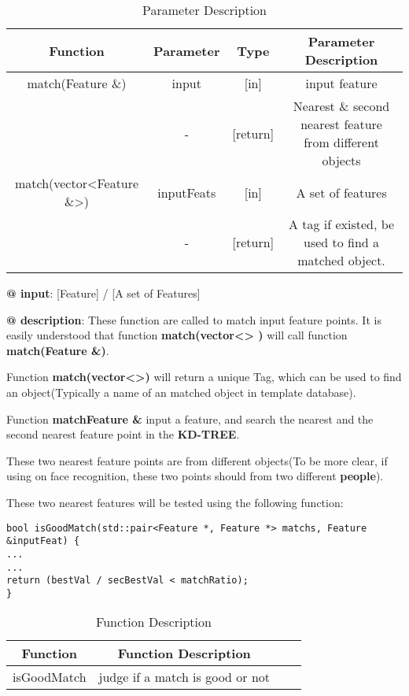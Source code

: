 \documentclass[paper=a4, fontsize=11pt]{scrartcl} %
\numberwithin{equation}{section} %
\numberwithin{figure}{section} %
\numberwithin{table}{section} %
\begin{document}
\begin{table}[h]
    \centering
    \begin{tabular}{|c|c|c|c|}
        \hline
        \textbf{Function} & \textbf{Parameter} & \textbf{Type} & \textbf{Parameter Description} \\\hline
            match(Feature \&) & input & [in] & input feature\\
                           & - & [return] & Nearest \& second nearest feature from different objects\\\hline
        match(vector<Feature \&>)& inputFeats & [in] & A set of features \\
                              & - & [return] & A tag if existed, be used to find a matched object.\\\hline
    \end{tabular}
    \caption{Parameter Description}\label{nolock}
\end{table}

\textbf{@ input}: [Feature] / [A set of Features]

\textbf{@ description}: These function are called to match input feature points. It is easily understood that function \textbf{match(vector<> )} will call function \textbf{match(Feature \&)}.

Function \textbf{match(vector<>)} will return a unique Tag, which can be used to find an object(Typically a name of an matched object in template database). 

Function \textbf{match{Feature \&}} input a feature, and search the nearest and the second nearest feature point in the \textbf{KD-TREE}. 

These two nearest feature points are from different objects(To be more clear, if using on face recognition, these two points should from two different \textbf{people}).

These two nearest features will be tested using the following function:\\

\begin{lstlisting}
bool isGoodMatch(std::pair<Feature *, Feature *> matchs, Feature &inputFeat) {
...
...
return (bestVal / secBestVal < matchRatio);
}
\end{lstlisting}

\begin{table}[h]
    \centering
    \begin{tabular}{|c|c| lp{}}
        \hline
        \textbf{Function} & \textbf{Function Description} \\\hline
    isGoodMatch  & judge if a match is good or not \\\hline
    \end{tabular}
    \caption{Function Description}\label{nolock}
\end{table}
\end{document}
